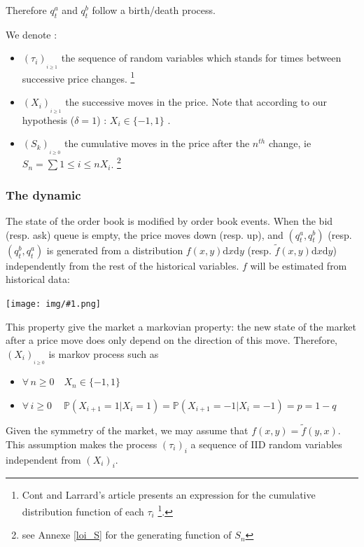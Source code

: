 \documentclass{article}
\newcommand{\IMG}[1] { \texttt{[image: img/\#1.png]} }
\begin{document}
 Therefore $q_t^a$ and $q_t^b$ follow a birth/death process.

We denote :
\begin{itemize}
\item $(\tau_i)_{_{i \geq 1}}$ the sequence of random variables  which stands for times between successive price changes. \footnote { Cont and Larrard's article presents an expression for the cumulative distribution function of each $\tau_i$ \footnote{See equations (3)-(4) of Cont and Larrard's article}. }
\item $(X_i)_{_{i \geq 1}}$ the successive moves in the price. Note that according to our hypothesis ($\delta = 1$) : $X_i \in \{-1,1\}$ .
\item $(S_k)_{_{i \geq 0}}$ the cumulative moves in the price after the $n^{th}$ change, ie $S_n = \sum{1 \leq i \leq n } X_i$. \footnote{ see Annexe \ref{loi_S} for the generating function of $S_n$ }  
\end{itemize}

\subsubsection{The dynamic}


The state  of the order book is modified by order book events. When the bid (resp. ask) queue is empty, the price moves down (resp. up), and $(q_t^a, q_t^b)$ (resp.$ (q_t^b, q_t^a)$ is generated from a distribution $f(x, y) \mathrm{d}x \mathrm{d}y $ (resp. $\tilde f(x, y) \mathrm{d}x \mathrm{d}y $) independently from the rest of the historical variables.
$f$ will be estimated from historical data:

\IMG{hist_f}


This property give the market a markovian property: the new state of the market after a price move does only depend on the direction of this move.
Therefore,  $(X_i)_{_{i \geq 0}}$ is markov process such as 

\begin{itemize}
\item $\forall \, n\geq0 \quad X_{n} \in \{-1,1\} $ 
\item $\forall \, i\geq0 \quad\ \mathbb{P}( X_{i+1}=1 | X_i=1 ) = \mathbb{P}( X_{i+1}=-1 | X_i=-1 ) = p = 1-q$
\end{itemize}

Given the symmetry of the market, we may assume that $f(x, y) = \tilde f(y, x)$. This assumption makes the process $(\tau_i)_i$ a sequence of IID random variables independent from $(X_i)_i$.
\end{document}
